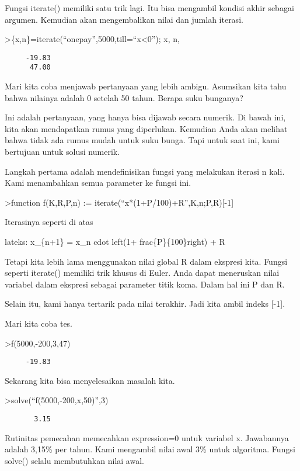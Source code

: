 \documentclass[
]{book}
\begin{document}
Fungsi iterate() memiliki satu trik lagi. Itu bisa mengambil kondisi akhir sebagai argumen. Kemudian akan mengembalikan nilai dan jumlah iterasi.

\textgreater\{x,n\}=iterate(``onepay'',5000,till=``x\textless0''); x, n,

\begin{verbatim}
     -19.83 
      47.00 
\end{verbatim}

Mari kita coba menjawab pertanyaan yang lebih ambigu. Asumsikan kita tahu bahwa nilainya adalah 0 setelah 50 tahun. Berapa suku bunganya?

Ini adalah pertanyaan, yang hanya bisa dijawab secara numerik. Di bawah ini, kita akan mendapatkan rumus yang diperlukan. Kemudian Anda akan melihat bahwa tidak ada rumus mudah untuk suku bunga. Tapi untuk saat ini, kami bertujuan untuk solusi numerik.

Langkah pertama adalah mendefinisikan fungsi yang melakukan iterasi n kali. Kami menambahkan semua parameter ke fungsi ini.

\textgreater function f(K,R,P,n) := iterate(``x*(1+P/100)+R'',K,n;P,R){[}-1{]}

Iterasinya seperti di atas

lateks: x\_\{n+1\} = x\_n cdot left(1+ frac\{P\}\{100\}right) + R

Tetapi kita lebih lama menggunakan nilai global R dalam ekspresi kita. Fungsi seperti iterate() memiliki trik khusus di Euler. Anda dapat meneruskan nilai variabel dalam ekspresi sebagai parameter titik koma. Dalam hal ini P dan R.

Selain itu, kami hanya tertarik pada nilai terakhir. Jadi kita ambil indeks {[}-1{]}.

Mari kita coba tes.

\textgreater f(5000,-200,3,47)

\begin{verbatim}
     -19.83 
\end{verbatim}

Sekarang kita bisa menyelesaikan masalah kita.

\textgreater solve(``f(5000,-200,x,50)'',3)

\begin{verbatim}
       3.15 
\end{verbatim}

Rutinitas pemecahan memecahkan expression=0 untuk variabel x. Jawabannya adalah 3,15\% per tahun. Kami mengambil nilai awal 3\% untuk algoritma. Fungsi solve() selalu membutuhkan nilai awal.
\end{document}
